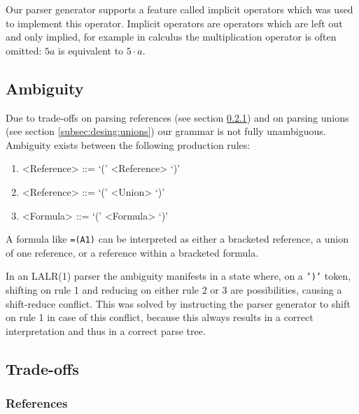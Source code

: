 \documentclass[conference]{IEEEtran}
\begin{document}
Our parser generator supports a feature called implicit operators which was used to implement this operator.
Implicit operators are operators which are left out and only implied, for example in calculus the multiplication operator is often omitted: $5a$ is equivalent to $5 \cdot a$.

\subsection{Ambiguity}
\label{sec:ambiguity}

Due to trade-offs on parsing references (see section \ref{tradeoff:references}) and on parsing unions (see section \ref{subsec:desing:unions}) our grammar is not fully unambiguous.
Ambiguity exists between the following production rules:
\begin{enumerate}
\item \begin{grammar}<Reference> ::= `(' <Reference> `)'\end{grammar}
\item \begin{grammar}<Reference> ::= `(' <Union> `)'\end{grammar}
\item \begin{grammar}<Formula> ::= `(' <Formula> `)'\end{grammar}
\end{enumerate}

A formula like \texttt{=(A1)} can be interpreted as either a bracketed reference, a union of one reference, or a reference within a bracketed formula.

In an LALR(1) parser the ambiguity manifests in a state where, on a \texttt{')'} token, shifting on rule 1 and reducing on either rule 2 or 3 are possibilities, causing a shift-reduce conflict.
This was solved by instructing the parser generator to shift on rule 1 in case of this conflict, because this always results in a correct interpretation and thus in a correct parse tree.

\subsection{Trade-offs}

\subsubsection{\textbf{References}}
\label{tradeoff:references}
\end{document}

